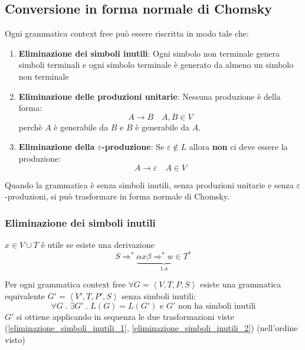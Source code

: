 \documentclass[a4paper]{article}
\begin{document}
\subsection{Conversione in forma normale di Chomsky}
Ogni grammatica context free può essere riscritta in modo tale che:
\begin{enumerate}
  \item \textbf{Eliminazione dei simboli inutili}: Ogni simbolo non terminale genera
    simboli terminali e ogni simbolo terminale è generato da almeno un simbolo non
    terminale

  \item \textbf{Eliminazione delle produzioni unitarie}: Nessuna produzione è della forma:
    \[
      A \to B \quad A, B \in V
    \] 
    perchè \( A \) è generabile da \( B \) e \( B \) è generabile da \( A \).

  \item \textbf{Eliminazione della \( \varepsilon \)-produzione}: Se
    \( \varepsilon \notin L \) allora \textbf{non} ci deve essere la produzione:
    \[
      A \to \varepsilon \quad A \in V
    \] 
\end{enumerate}

\begin{definition}
  Quando la grammatica è senza simboli inutili, senza produzioni unitarie e senza
  \( \varepsilon \)-produzioni, si può trasformare in forma normale di Chomsky.
\end{definition}

\subsubsection{Eliminazione dei simboli inutili}
\( x \in V \cup T \) è utile se esiste una derivazione
\[
  S \Rightarrow^* \underbrace{\alpha x \beta \Rightarrow^* w \in T^*}_{1.a}
\] 
\begin{theorem}
  Per ogni grammatica context free \( \forall G = \left< V, T, P, S \right> \) esiste
  una grammatica equivalente \( G' = \left< V', T, P', S \right> \) senza simboli
  inutili:
  \[
    \forall G \;.\; \exists G' \;.\; L(G) = L(G') \text{ e } G' \text{ non ha simboli inutili}
  \] 
  \( G' \) si ottiene applicando in sequenza le due trasformazioni viste
  (\ref{eliminazione_simboli_inutili_1}, \ref{eliminazione_simboli_inutili_2}) (nell'ordine visto)
\end{theorem}
\end{document}
